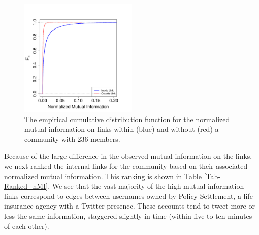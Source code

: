 \documentclass[12pt]{article}
\begin{document}
\begin{figure}[h!]
  \centering
\includegraphics[width=0.50\textwidth]{Figures/out-v-in.pdf}
\caption{The empirical cumulative distribution function for the normalized mutual information on links within (blue) and without (red) a community with 236 members.}
\label{Fig-Out_v_In_Links}
\end{figure}

Because of the large difference in the observed mutual information on the links, we next ranked the internal links for the community based on their associated normalized mutual information. This ranking is shown in Table \ref{Tab-Ranked_nMI}. We see that the vast majority of the high mutual information links correspond to edges between usernames owned by Policy Settlement, a life insurance agency with a Twitter presence. These accounts tend to tweet more or less the same information, staggered slightly in time (within five to ten minutes of each other).
\end{document}
